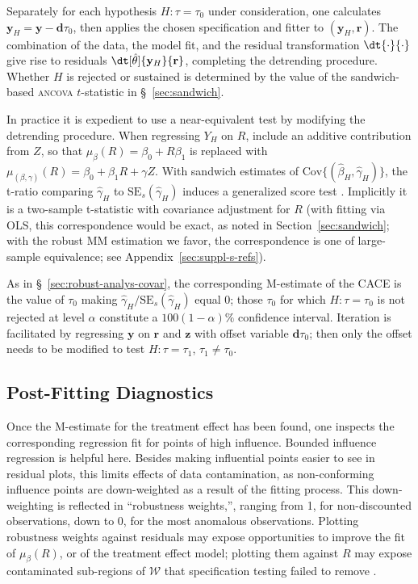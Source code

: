 Separately for each hypothesis $H: \tau=\tau_0$ under
consideration, one calculates
$\mathbf{y}_{H} = \mathbf{y} - \mathbf{d}\tau_{0}$, then
applies the chosen specification and fitter to
$(\mathbf{y}_{H}, \mathbf{r})$.
The combination of the data, the
model fit, and the residual transformation $\dt{\cdot}{\cdot}$ give rise to residuals
$\dt[\hat\theta]{\mathbf{y}_{H}}{\mathbf{r}}$, completing the
detrending procedure. Whether $H$ is rejected or sustained is
determined by the value of the sandwich-based \textsc{ancova} $t$-statistic
in \S~\ref{sec:sandwich}.

In practice it is expedient to use a near-equivalent
test by modifying the detrending
procedure.
When regressing $Y_{H}$ on $R$, include an additive
contribution from $Z$, so that $\mu_{\beta}(R) =\beta_{0} +
R\beta_{1}$ is replaced with $\mu_{(\beta,\gamma)}(R) =\beta_{0} +
\beta_{1}R + \gamma Z$. With sandwich estimates of
$\text{Cov}\{(\hat{\beta}_{H}, \hat{\gamma}_{H})\}$,
the t-ratio comparing $\hat{\gamma}_{H}$ to
$\text{SE}_{s}(\hat{\gamma}_{H})$ induces a generalized score test \citep{boos1992genscoretest}. Implicitly it is a two-sample
t-statistic with covariance adjustment for $R$ (with fitting via OLS,
this correspondence would be exact, as noted in Section~\ref{sec:sandwich}; with the robust MM estimation we
favor, the correspondence is one of large-sample equivalence; see Appendix~\ref{sec:suppl-s-refs}).

As in \S~\ref{sec:robust-analys-covar}, the corresponding
M-estimate of the CACE is the value of $\tau_{0}$ making
$\hat{\gamma}_{H}/\text{SE}_{s}(\hat{\gamma}_{H})$ equal 0; those $\tau_{0}$ for
which $H: \tau = \tau_{0}$ is not rejected at level $\alpha$
constitute a $100(1-\alpha)\%$ confidence interval.  Iteration is
facilitated by regressing $\mathbf{y}$ on $\mathbf{r}$ and
$\mathbf{z}$ with offset variable $\mathbf{d}\tau_{0}$; then only the
offset needs to be modified to test $H: \tau = \tau_{1}$,
$\tau_{1}\neq \tau_{0}$.


\subsection{Post-Fitting Diagnostics} \label{sec:post-fitt-diagn}
Once the M-estimate for the treatment effect has been found, one
inspects the corresponding regression fit for points of high influence.
Bounded influence regression is helpful here.  Besides making
influential points easier to see in residual plots, this limits
effects of data contamination, as non-conforming influence points are
down-weighted as a result of the fitting process. This down-weighting
is reflected in ``robustness weights,'', ranging from 1, for non-discounted
observations, down to 0, for the most anomalous observations.
Plotting %
robustness weights against residuals may expose opportunities to
improve the fit of $\mu_{\beta}(R)$, or of the treatment effect model;
plotting them against $R$ may expose contaminated sub-regions
of $\mathcal{W}$ that specification testing failed to remove
\citep{maronna2006robust}.